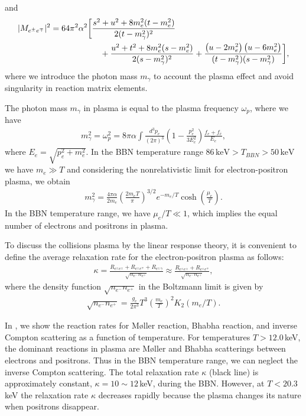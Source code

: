 and
\begin{align}
|M_{e^\pm e^\mp}|^{2}=64\pi^{2}\alpha^{2}
\bigg[&\frac{s^{2}+u^{2}+8m_e^{2}(t-m_e^{2})}{2(t-m^2_{\gamma})^{2}}\notag\\
&\quad+\frac{u^{2}+t^{2}+8m_e^{2}
(s-m_e^{2})}{2(s-m^2_{\gamma})^{2}} + \frac{\left({u}-2m_e^{2}\right)\left({u}-6m_e^{2}\right)}
 {(t-m^2_{\gamma})(s-m^2_{\gamma})} \bigg],
\label{M_fi_b}
\end{align}
where we introduce the photon mass $m_\gamma$ to account the plasma effect and avoid singularity in reaction matrix elements. 

The photon mass $m_\gamma$ in plasma is equal to the plasma frequency $\omega_p$, where we have~\cite{Kislinger:1975uy}
\begin{align}
m^2_\gamma=\omega^2_{p}=8\pi\alpha\int\frac{d^3p_e}{(2\pi)^3}\left(1-\frac{p_e^2}{3E_e^2}\right)\frac{f_e+f_{\bar e}}{E_e},
\end{align}
where $E_e=\sqrt{p_e^2+m^2_e}$. In the BBN temperature range $86\,\mathrm{keV}>T_{BBN}>50\,\mathrm{keV}$ we have $m_e\gg T$ and considering the nonrelativistic limit for electron-positron plasma, we obtain
\begin{align}
m^2_\gamma=\frac{4\pi\alpha}{2m_e}\left(\frac{2m_eT}{\pi}\right)^{3/2}e^{-m_e/T}\cosh\left(\frac{\mu_e}{T}\right).
\end{align}
In the BBN temperature range, we have $\mu_e/T\ll1$, which implies the equal number of electrons and positrons in plasma.

To discuss the collisions plasma by the linear response theory, it is convenient to define the average relaxation rate for the electron-positron plasma as follows:
\begin{align}\label{Kappa}
\kappa=\frac{R_{e^\pm e^\pm}+R_{e^\pm e^\mp}+R_{e^\pm\gamma}}{\sqrt{n_{e^-}n_{e^+}}}\approx\frac{R_{e^\pm e^\pm}+R_{e^\pm e^\mp}}{\sqrt{n_{e^-}n_{e^+}}},
\end{align}
where the density function ${\sqrt{n_{e^-}n_{e^+}}}$ in the Boltzmann limit is given by
\begin{align}
{\sqrt{n_{e^-}n_{e^+}}}=\frac{g_e}{2\pi^3}T^3\left(\frac{m_e}{T}\right)^2K_2(m_e/T).
\end{align}

In , we show the reaction rates for M{\o}ller reaction, Bhabha reaction, and inverse Compton scattering as a function of temperature. For temperatures $T>12.0$\,keV, the dominant reactions in plasma are M{\o}ller and Bhabha scatterings between electrons and positrons. Thus in the BBN temperature range, we can neglect the inverse Compton scattering. The total relaxation rate $\kappa$ (black line) is approximately constant, $\kappa=10\sim12$\,keV, during the BBN. However, at $T<20.3$\,keV the relaxation rate $\kappa$ decreases rapidly because the plasma changes its nature when positrons disappear.

